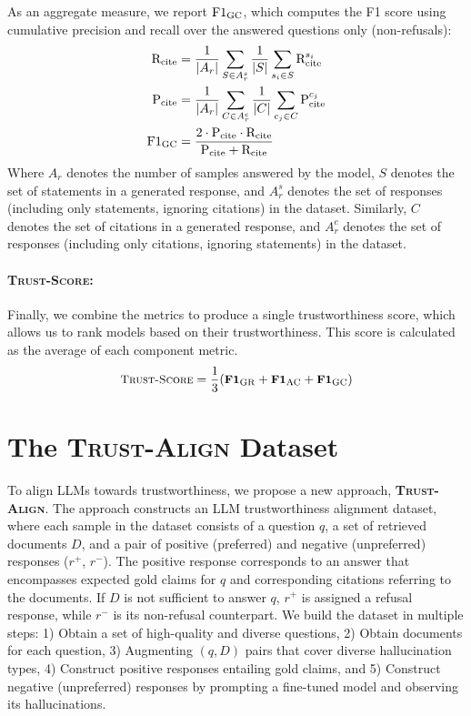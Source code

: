 \documentclass{article} %
\newcommand{\method}[0]{\textsc{Trust-Align}}
\newcommand{\metric}[0]{\textsc{Trust-Score}}
\begin{document}
As an aggregate measure, we report \textbf{$\text{F1\textsubscript{GC}}$}, which computes the F1 score using cumulative precision and recall over the answered questions only (non-refusals):
%
\begin{align}
    \text{R}_\text{cite} &= \frac{1}{|A_r|}\sum_{S \in A_r^s}\frac{1}{|S|} \sum_{s_i \in S} \text{R}_\text{cite}^{s_i} \\
    \text{P}_\text{cite} &= \frac{1}{|A_r|} \sum_{C \in A_r^c}\frac{1}{|C|} \sum_{c_j \in C} \text{P}_\text{cite}^{c_j} \\
    \text{F1\textsubscript{GC}} &= \frac{2 \cdot \text{P}_\text{cite} \cdot \text{R}_\text{cite}}{\text{P}_\text{cite} + \text{R}_\text{cite}}
\end{align}
%
Where \(A_r\) denotes the number of samples answered by the model, \(S\) denotes the set of statements in a generated response, and \(A_r^s\) denotes the set of responses (including only statements, ignoring citations) in the dataset. Similarly, \(C\) denotes the set of citations in a generated response, and \(A_r^c\) denotes the set of responses (including only citations, ignoring statements) in the dataset.

\paragraph{\metric{}:} 
Finally, we combine the metrics to produce a single trustworthiness score, which allows us to rank models based on their trustworthiness. This score is calculated as the average of each component metric.
%
\begin{align}
\small
\text{\metric{}} = \frac{1}{3} (\textbf{F1}_{\text{GR}} + \textbf{F1}_{\text{AC}} + \textbf{F1}_{\text{GC}})
\end{align}
%

\section{The \method{} Dataset} \label{sec: trustframeworkappendix}
To align LLMs towards trustworthiness, we propose a new approach, \textbf{\method{}}. The approach constructs an LLM trustworthiness alignment dataset, where each sample in the dataset consists of a question \(q\), a set of retrieved documents \(D\), and a pair of positive (preferred) and negative (unpreferred) responses (\(r^+\), \(r^-\)). The positive response corresponds to an answer that encompasses expected gold claims for $q$ and corresponding citations referring to the documents. If \(D\) is not sufficient to answer \(q\), \(r^+\) is assigned a refusal response, while \(r^-\) is its non-refusal counterpart. We build the dataset in multiple steps: 1) Obtain a set of high-quality and diverse questions, 2) Obtain documents for each question, 3) Augmenting $(q, D)$ pairs that cover diverse hallucination types, 4) Construct positive responses entailing gold claims, and 5) Construct negative (unpreferred) responses by prompting a fine-tuned model and observing its hallucinations.
\end{document}

